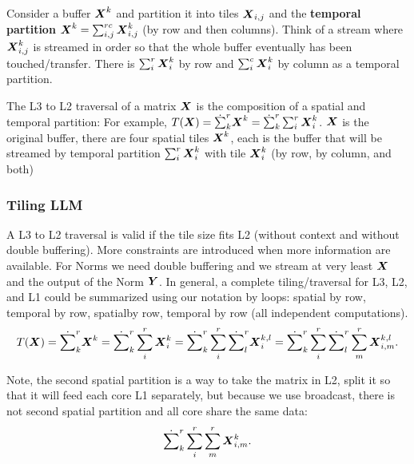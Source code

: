 \documentclass[acmsmall]{acmart}
\begin{document}
\begin{definition}
  Consider a buffer ${\boldsymbol X}^k$ and partition it into tiles
  ${\boldsymbol X}_{i,j}$ and the {\bf temporal partition} ${\boldsymbol X}^k =
  \sum_{i,j}^{rc}{\boldsymbol X}^k_{i,j}$ (by row and then columns). Think of a
  stream where ${\boldsymbol X}^k_{i,j}$ is streamed in order so that the whole
  buffer eventually has been touched/transfer. There is
  $\sum_{i}^r{\boldsymbol X}^k_{i}$ by row and $\sum_{i}^c{\boldsymbol X}^k_{i}$ by
  column as a temporal partition.
\end{definition}


\begin{definition}
  The L3 to L2 traversal of a matrix ${\boldsymbol X}$ is the composition of a
  spatial and temporal partition: For example, $T({\boldsymbol X}) =
  \dot\sum_k^r {\boldsymbol X}^k = \dot\sum_k^r\sum_{i}^{r}{\boldsymbol X}^k_{i}$.
  ${\boldsymbol X}$ is the original buffer, there are four spatial tiles
  ${\boldsymbol X}^k$, each is the buffer that will be streamed by temporal
  partition $\sum_{i}^r{\boldsymbol X}^k_{i}$ with tile ${\boldsymbol X}^k_{i}$ (by row,
  by column, and both)
\end{definition}

\subsubsection{Tiling LLM}
A L3 to L2 traversal is valid if the tile size fits L2 (without
context and without double buffering). More constraints are introduced
when more information are available. For Norms we need double
buffering and we stream at very least ${\boldsymbol X}$ and the output of the
Norm ${\boldsymbol Y}$. In general, a complete tiling/traversal for L3, L2, and
L1 could be summarized using our notation by loops: spatial by row, temporal by row,
spatialby row, temporal by row (all independent computations).
\begin{equation}
T({\boldsymbol X}) = \dot\sum_k^r {\boldsymbol X}^k =
\dot\sum_k^r\sum_{i}^{r}{\boldsymbol X}^k_{i} =
\dot\sum_k^r\sum_{i}^{r}\dot\sum_l^r{\boldsymbol X}^{k,l}_{i} =
\dot\sum_k^r\sum_{i}^r\dot\sum_l^r\sum_{m}^r{\boldsymbol X}^{k,l}_{i,m}.
\end{equation}

Note, the second spatial partition is a way to take the matrix in L2,
split it so that it will feed each core L1 separately, but because we
use broadcast, there is not second spatial partition and all core
share the same data:
\begin{equation}
\dot\sum_k^r\sum_{i}^r\sum_{m}^r{\boldsymbol X}^{k}_{i,m}.
\end{equation}
\end{document}
